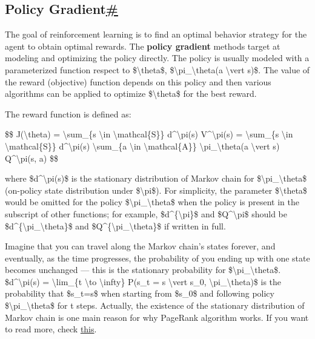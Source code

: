 \subsection{\texorpdfstring{Policy Gradient\hyperref[policy-gradient]{\#}}{Policy Gradient\#}}\label{policy-gradient}

The goal of reinforcement learning is to find an optimal behavior strategy for the agent to obtain optimal rewards. The \textbf{policy gradient} methods target at modeling and optimizing the policy directly. The policy is usually modeled with a parameterized function respect to \$\textbackslash theta\$, \$\textbackslash pi\_\textbackslash theta(a \textbackslash vert s)\$. The value of the reward (objective) function depends on this policy and then various algorithms can be applied to optimize \$\textbackslash theta\$ for the best reward.

The reward function is defined as:

\$\$ J(\textbackslash theta) = \textbackslash sum\_\{s \textbackslash in \textbackslash mathcal\{S\}\} d\^{}\textbackslash pi(s) V\^{}\textbackslash pi(s) = \textbackslash sum\_\{s \textbackslash in \textbackslash mathcal\{S\}\} d\^{}\textbackslash pi(s) \textbackslash sum\_\{a \textbackslash in \textbackslash mathcal\{A\}\} \textbackslash pi\_\textbackslash theta(a \textbackslash vert s) Q\^{}\textbackslash pi(s, a) \$\$

where \$d\^{}\textbackslash pi(s)\$ is the stationary distribution of Markov chain for \$\textbackslash pi\_\textbackslash theta\$ (on-policy state distribution under \$\textbackslash pi\$). For simplicity, the parameter \$\textbackslash theta\$ would be omitted for the policy \$\textbackslash pi\_\textbackslash theta\$ when the policy is present in the subscript of other functions; for example, \$d\^{}\{\textbackslash pi\}\$ and \$Q\^{}\textbackslash pi\$ should be \$d\^{}\{\textbackslash pi\_\textbackslash theta\}\$ and \$Q\^{}\{\textbackslash pi\_\textbackslash theta\}\$ if written in full.

Imagine that you can travel along the Markov chain's states forever, and eventually, as the time progresses, the probability of you ending up with one state becomes unchanged --- this is the stationary probability for \$\textbackslash pi\_\textbackslash theta\$. \$d\^{}\textbackslash pi(s) = \textbackslash lim\_\{t \textbackslash to \textbackslash infty\} P(s\_t = s \textbackslash vert s\_0, \textbackslash pi\_\textbackslash theta)\$ is the probability that \$s\_t=s\$ when starting from \$s\_0\$ and following policy \$\textbackslash pi\_\textbackslash theta\$ for t steps. Actually, the existence of the stationary distribution of Markov chain is one main reason for why PageRank algorithm works. If you want to read more, check \href{https://jeremykun.com/2015/04/06/markov-chain-monte-carlo-without-all-the-bullshit/}{this}.

